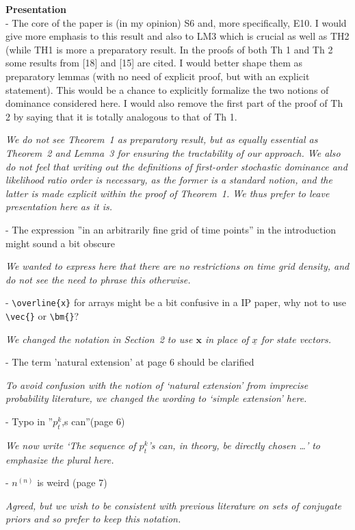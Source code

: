 \documentclass[12pt, a4paper]{elsarticle}
\newcommand{\bs}[1]{\boldsymbol{#1}}
\renewcommand{\vec}[1]{{\bs#1}}
\newcommand{\ptk}{p^k_t}
\begin{document}
\textbf{Presentation}\\
- The core of the paper is (in my opinion) S6 and, more specifically, E10. I would give more emphasis to this result and also to LM3 which is crucial as well as TH2 (while TH1 is more a preparatory result. In the proofs of both Th 1 and Th 2 some results from [18] and [15] are cited. I would better shape them as preparatory lemmas (with no need of explicit proof, but with an explicit statement). This would be a chance to explicitly formalize the two notions of dominance considered here. I would also remove the first part of the proof of Th 2 by saying that it is totally analogous to that of Th 1.

\medskip
\emph{We do not see Theorem~1 as preparatory result, but as equally essential as Theorem~2 and Lemma~3
for ensuring the tractability of our approach.
We also do not feel that writing out the definitions of first-order stochastic dominance and likelihood ratio order is necessary,
as the former is a standard notion, and the latter is made explicit within the proof of Theorem~1.
We thus prefer to leave presentation here as it is.}
\medskip

- The expression ''in an arbitrarily fine grid of time points'' in the introduction might sound a bit obscure

\medskip
\emph{We wanted to express here that there are no restrictions on time grid density,
and do not see the need to phrase this otherwise.}
\medskip

- \verb+\overline{x}+ for arrays might be a bit confusive in a IP paper, why not to use \verb+\vec{}+ or \verb+\bm{}+?

\medskip
\emph{We changed the notation in Section~2 to use $\vec{x}$ in place of $\underline{x}$ for state vectors.}
\medskip

- The term 'natural extension' at page 6 should be clarified

\medskip
\emph{To avoid confusion with the notion of `natural extension' from imprecise probability literature,
we changed the wording to `simple extension' here.}
\medskip

- Typo in ''$p_t^k$,s can''(page 6)

\medskip
\emph{We now write `The sequence of $\ptk$'s can, in theory, be directly chosen \ldots' to emphasize the plural here.}
\medskip

- $n^{(n)}$ is weird (page 7)

\medskip
\emph{Agreed, but we wish to be consistent with previous literature on sets of conjugate priors and so prefer to keep this notation.}
\medskip
\end{document}

